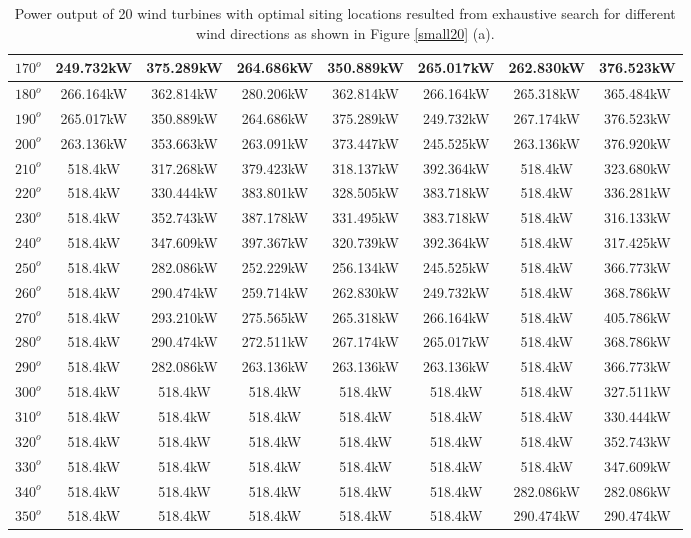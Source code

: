 \begin{table}[H]
\begin{tabular}{|c|c|c|c|c|c|c|c|}
		$170^o$	& 249.732kW	& 375.289kW	& 264.686kW	& 350.889kW	& 265.017kW	& 262.830kW	& 376.523kW	\\ \hline
		$180^o$	& 266.164kW	& 362.814kW	& 280.206kW	& 362.814kW	& 266.164kW	& 265.318kW	& 365.484kW	\\ \hline
		$190^o$	& 265.017kW	& 350.889kW	& 264.686kW	& 375.289kW	& 249.732kW	& 267.174kW	& 376.523kW	\\ \hline
		$200^o$	& 263.136kW	& 353.663kW	& 263.091kW	& 373.447kW	& 245.525kW	& 263.136kW	& 376.920kW	\\ \hline
		$210^o$	& 518.4kW	& 317.268kW	& 379.423kW	& 318.137kW	& 392.364kW	& 518.4kW	& 323.680kW	\\ \hline
		$220^o$	& 518.4kW	& 330.444kW	& 383.801kW	& 328.505kW	& 383.718kW	& 518.4kW	& 336.281kW	\\ \hline
		$230^o$	& 518.4kW	& 352.743kW	& 387.178kW	& 331.495kW	& 383.718kW	& 518.4kW	& 316.133kW	\\ \hline
		$240^o$	& 518.4kW	& 347.609kW	& 397.367kW	& 320.739kW	& 392.364kW	& 518.4kW	& 317.425kW	\\ \hline
		$250^o$	& 518.4kW	& 282.086kW	& 252.229kW	& 256.134kW	& 245.525kW	& 518.4kW	& 366.773kW	\\ \hline
		$260^o$	& 518.4kW	& 290.474kW	& 259.714kW	& 262.830kW	& 249.732kW	& 518.4kW	& 368.786kW	\\ \hline
		$270^o$	& 518.4kW	& 293.210kW	& 275.565kW	& 265.318kW	& 266.164kW	& 518.4kW	& 405.786kW	\\ \hline
		$280^o$	& 518.4kW	& 290.474kW	& 272.511kW	& 267.174kW	& 265.017kW	& 518.4kW	& 368.786kW	\\ \hline
		$290^o$	& 518.4kW	& 282.086kW	& 263.136kW	& 263.136kW	& 263.136kW	& 518.4kW	& 366.773kW	\\ \hline
		$300^o$	& 518.4kW	& 518.4kW	& 518.4kW	& 518.4kW	& 518.4kW	& 518.4kW	& 327.511kW	\\ \hline
		$310^o$	& 518.4kW	& 518.4kW	& 518.4kW	& 518.4kW	& 518.4kW	& 518.4kW	& 330.444kW	\\ \hline
		$320^o$	& 518.4kW	& 518.4kW	& 518.4kW	& 518.4kW	& 518.4kW	& 518.4kW	& 352.743kW	\\ \hline
		$330^o$	& 518.4kW	& 518.4kW	& 518.4kW	& 518.4kW	& 518.4kW	& 518.4kW	& 347.609kW	\\ \hline
		$340^o$	& 518.4kW	& 518.4kW	& 518.4kW	& 518.4kW	& 518.4kW	& 282.086kW	& 282.086kW	\\ \hline
		$350^o$	& 518.4kW	& 518.4kW	& 518.4kW	& 518.4kW	& 518.4kW	& 290.474kW	& 290.474kW	\\ \hline
        	\end{tabular}
        	\caption{Power output of 20 wind turbines with optimal siting locations resulted from exhaustive search for different wind directions as shown in Figure \ref{small20} (a).}
        	\label{table20a}
        \end{table}
